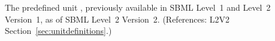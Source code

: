 The predefined unit , previously available in SBML Level~1 and
Level~2 Version~1,  as of SBML Level~2 Version~2.  (References: L2V2
Section~\ref{sec:unitdefinitions}.)
